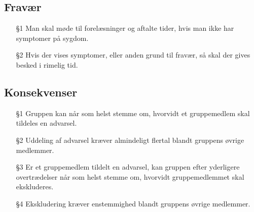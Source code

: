 \subsection*{Fravær}
\begin{itemize}
    \item[§1] Man skal møde til forelæsninger og aftalte tider, hvis man ikke har symptomer på sygdom.
    \item[§2] Hvis der vises symptomer, eller anden grund til fravær, så skal der gives besked i rimelig tid.
\end{itemize}

\subsection*{Konsekvenser}
\begin{itemize}
    \item[§1] Gruppen kan når som helst stemme om, hvorvidt et gruppemedlem skal tildeles en advarsel.
    \item[§2] Uddeling af advarsel kræver almindeligt flertal blandt gruppens øvrige medlemmer.
    \item[§3] Er et gruppemedlem tildelt en advarsel, kan gruppen efter yderligere overtrædelser når som helst stemme om, hvorvidt gruppemedlemmet skal ekskluderes.
    \item[§4] Ekskludering kræver enstemmighed blandt gruppens øvrige medlemmer.
\end{itemize}
